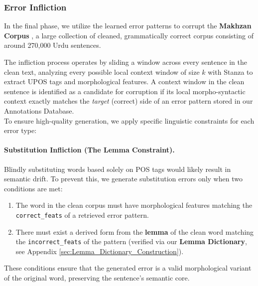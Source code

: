 \documentclass[11pt]{article}
\begin{document}
\subsubsection{Error Infliction}
\label{sec:Infliction}
In the final phase, we utilize the learned error patterns to corrupt the \textbf{Makhzan Corpus} \cite{makhzan}, a large collection of cleaned, grammatically correct corpus consisting of around 270,000 Urdu sentences.

The infliction process operates by sliding a window across every sentence in the clean text, analyzing every possible local context window of size $k$ with Stanza to extract UPOS tags and morphological features. A context window in the clean sentence is identified as a candidate for corruption if its local morpho-syntactic context exactly matches the \textit{target} (correct) side of an error pattern stored in our Annotations Database. 
\\
To ensure high-quality generation, we apply specific linguistic constraints for each error type:

\paragraph{Substitution Infliction (The Lemma Constraint).}
Blindly substituting words based solely on POS tags would likely result in semantic drift. To prevent this, we generate substitution errors only when two conditions are met:
\begin{enumerate}
\setlength{\itemsep}{0pt}
\setlength{\parskip}{0pt}
    \item The word in the clean corpus must have morphological features matching the \verb|correct_feats| of a retrieved error pattern.
    \item There must exist a derived form from the \textbf{lemma} of the clean word matching the \verb|incorrect_feats| of the pattern (verified via our \textbf{Lemma Dictionary}, see Appendix \ref{sec:Lemma_Dictionary_Construction}).
\end{enumerate}
These conditions ensure that the generated error is a valid morphological variant of the original word, preserving the sentence's semantic core.
\end{document}
